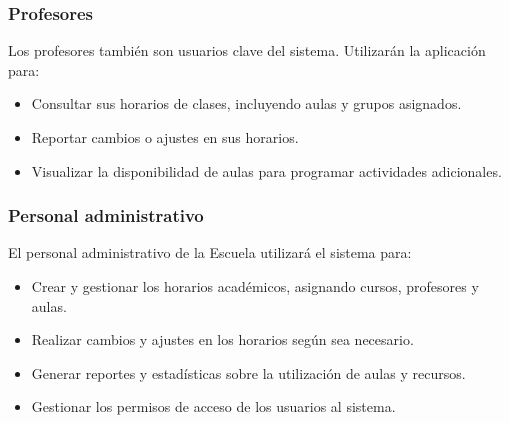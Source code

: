 \documentclass[12pt]{article} %
\begin{document}
\subsubsection{Profesores}
\noindent
Los profesores también son usuarios clave del sistema. Utilizarán la aplicación para:
\begin{itemize}
    \item Consultar sus horarios de clases, incluyendo aulas y grupos asignados.
    \item Reportar cambios o ajustes en sus horarios.
    \item Visualizar la disponibilidad de aulas para programar actividades adicionales.
\end{itemize}
\subsubsection{Personal administrativo}
\noindent
El personal administrativo de la Escuela utilizará el sistema para:
\begin{itemize}
    \item Crear y gestionar los horarios académicos, asignando cursos, profesores y aulas.
    \item Realizar cambios y ajustes en los horarios según sea necesario.
    \item Generar reportes y estadísticas sobre la utilización de aulas y recursos.
    \item Gestionar los permisos de acceso de los usuarios al sistema.    
\end{itemize}
\end{document}
